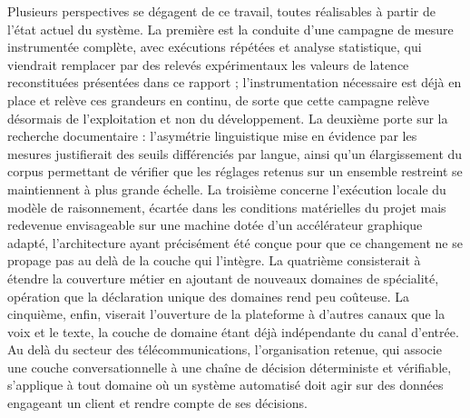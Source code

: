 Plusieurs perspectives se dégagent de ce travail, toutes réalisables à partir de l'état actuel du système. La première est la conduite d'une campagne de mesure instrumentée complète, avec exécutions répétées et analyse statistique, qui viendrait remplacer par des relevés expérimentaux les valeurs de latence reconstituées présentées dans ce rapport ; l'instrumentation nécessaire est déjà en place et relève ces grandeurs en continu, de sorte que cette campagne relève désormais de l'exploitation et non du développement. La deuxième porte sur la recherche documentaire : l'asymétrie linguistique mise en évidence par les mesures justifierait des seuils différenciés par langue, ainsi qu'un élargissement du corpus permettant de vérifier que les réglages retenus sur un ensemble restreint se maintiennent à plus grande échelle. La troisième concerne l'exécution locale du modèle de raisonnement, écartée dans les conditions matérielles du projet mais redevenue envisageable sur une machine dotée d'un accélérateur graphique adapté, l'architecture ayant précisément été conçue pour que ce changement ne se propage pas au delà de la couche qui l'intègre. La quatrième consisterait à étendre la couverture métier en ajoutant de nouveaux domaines de spécialité, opération que la déclaration unique des domaines rend peu coûteuse. La cinquième, enfin, viserait l'ouverture de la plateforme à d'autres canaux que la voix et le texte, la couche de domaine étant déjà indépendante du canal d'entrée. Au delà du secteur des télécommunications, l'organisation retenue, qui associe une couche conversationnelle à une chaîne de décision déterministe et vérifiable, s'applique à tout domaine où un système automatisé doit agir sur des données engageant un client et rendre compte de ses décisions.
